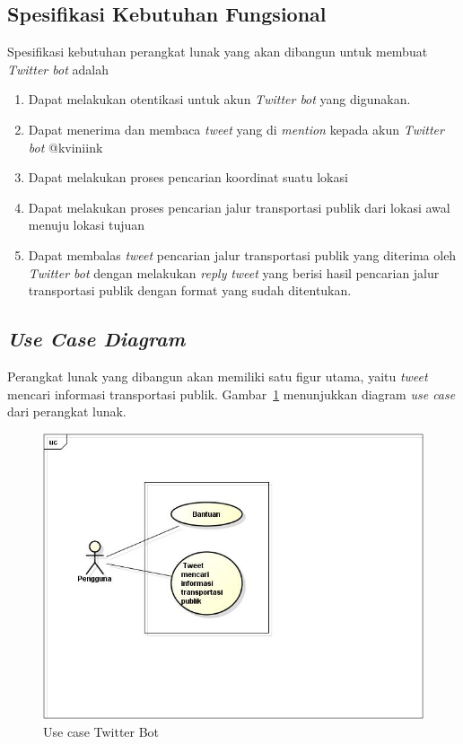 \subsection{Spesifikasi Kebutuhan Fungsional}
Spesifikasi kebutuhan perangkat lunak yang akan dibangun untuk membuat \textit{Twitter bot} adalah
\begin{enumerate}
	\item Dapat melakukan otentikasi untuk akun \textit{Twitter bot} yang digunakan.
	\item Dapat menerima dan membaca \textit{tweet} yang di \textit{mention} kepada akun \textit{Twitter bot} @kviniink
	\item Dapat melakukan proses pencarian koordinat suatu lokasi
	\item Dapat melakukan proses pencarian jalur transportasi publik dari lokasi awal menuju lokasi tujuan
	\item Dapat membalas \textit{tweet} pencarian jalur transportasi publik yang diterima oleh \textit{Twitter bot} dengan melakukan \textit{reply} \textit{tweet} yang berisi hasil pencarian jalur transportasi publik dengan format yang sudah ditentukan.
\end{enumerate}

\subsection{\textit{Use Case Diagram}}
Perangkat lunak yang dibangun akan memiliki satu figur utama, yaitu \textit{tweet} mencari informasi transportasi publik. Gambar~\ref{fig:usecase} menunjukkan diagram \textit{use case} dari perangkat lunak.

\begin{figure}[htbp]
	\centering
		\includegraphics{Gambar/usecase.jpg}
	\caption{Use case Twitter Bot}
	\label{fig:usecase}
\end{figure}

